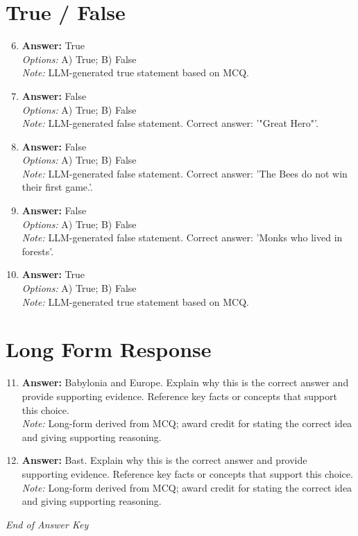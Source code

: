 \documentclass[12pt]{article}
\begin{document}
\section*{True / False}
\begin{enumerate}[label=\arabic*.]
\setcounter{enumi}{5}
\item \textbf{Answer:} True
\\ \textit{Options:} A) True; B) False
\\ \textit{Note:} LLM-generated true statement based on MCQ.
\item \textbf{Answer:} False
\\ \textit{Options:} A) True; B) False
\\ \textit{Note:} LLM-generated false statement. Correct answer: '"Great Hero"'.
\item \textbf{Answer:} False
\\ \textit{Options:} A) True; B) False
\\ \textit{Note:} LLM-generated false statement. Correct answer: 'The Bees do not win their first game.'.
\item \textbf{Answer:} False
\\ \textit{Options:} A) True; B) False
\\ \textit{Note:} LLM-generated false statement. Correct answer: 'Monks who lived in forests'.
\item \textbf{Answer:} True
\\ \textit{Options:} A) True; B) False
\\ \textit{Note:} LLM-generated true statement based on MCQ.
\end{enumerate}

\section*{Long Form Response}
\begin{enumerate}[label=\arabic*.]
\setcounter{enumi}{10}
\item \textbf{Answer:} Babylonia and Europe. Explain why this is the correct answer and provide supporting evidence. Reference key facts or concepts that support this choice.
\\ \textit{Note:} Long-form derived from MCQ; award credit for stating the correct idea and giving supporting reasoning.
\item \textbf{Answer:} Bast. Explain why this is the correct answer and provide supporting evidence. Reference key facts or concepts that support this choice.
\\ \textit{Note:} Long-form derived from MCQ; award credit for stating the correct idea and giving supporting reasoning.
\end{enumerate}

\vfill
\noindent\textit{End of Answer Key}
\end{document}

